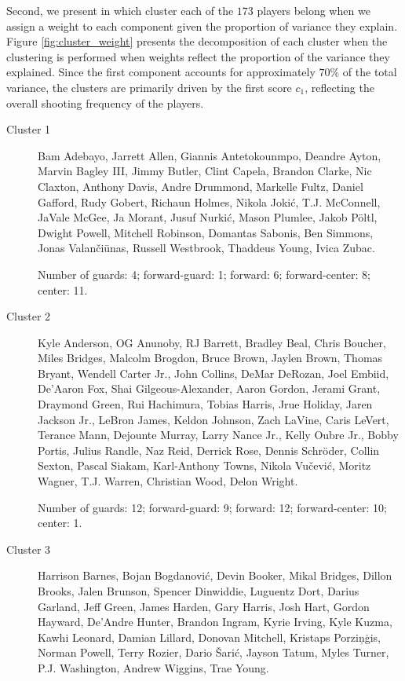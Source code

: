 \documentclass[USenglish]{article}
\theoremstyle{dgthm}
\theoremstyle{dgdef}
\begin{document}
\begin{appendix}
Second, we present in which cluster each of the $173$ players belong when we assign a weight to each component given the proportion of variance they explain. Figure \ref{fig:cluster_weight} presents the decomposition of each cluster when the clustering is performed when weights reflect the proportion of the variance they explained. Since the first component accounts for approximately $70\%$ of the total variance, the clusters are primarily driven by the first score $c_1$, reflecting the overall shooting frequency of the players.


\begin{description}
	\item[Cluster 1] Bam Adebayo, Jarrett Allen, Giannis Antetokounmpo, Deandre Ayton, Marvin Bagley III, Jimmy Butler, Clint Capela, Brandon Clarke, Nic Claxton, Anthony Davis, Andre Drummond, Markelle Fultz, Daniel Gafford, Rudy Gobert, Richaun Holmes, Nikola Jokić, T.J. McConnell, JaVale McGee, Ja Morant, Jusuf Nurkić, Mason Plumlee, Jakob Pöltl, Dwight Powell, Mitchell Robinson, Domantas Sabonis, Ben Simmons, Jonas Valančiūnas, Russell Westbrook, Thaddeus Young, Ivica Zubac.

	      Number of guards: 4; forward-guard: 1; forward: 6; forward-center: 8; center: 11.

	\item[Cluster 2] Kyle Anderson, OG Anunoby, RJ Barrett, Bradley Beal, Chris Boucher, Miles Bridges, Malcolm Brogdon, Bruce Brown, Jaylen Brown, Thomas Bryant, Wendell Carter Jr., John Collins, DeMar DeRozan, Joel Embiid, De'Aaron Fox, Shai Gilgeous-Alexander, Aaron Gordon, Jerami Grant, Draymond Green, Rui Hachimura, Tobias Harris, Jrue Holiday, Jaren Jackson Jr., LeBron James, Keldon Johnson, Zach LaVine, Caris LeVert, Terance Mann, Dejounte Murray, Larry Nance Jr., Kelly Oubre Jr., Bobby Portis, Julius Randle, Naz Reid, Derrick Rose, Dennis Schröder, Collin Sexton, Pascal Siakam, Karl-Anthony Towns, Nikola Vučević, Moritz Wagner, T.J. Warren, Christian Wood, Delon Wright.

	      Number of guards: 12; forward-guard: 9; forward: 12; forward-center: 10; center: 1.

	\item[Cluster 3] Harrison Barnes, Bojan Bogdanović, Devin Booker, Mikal Bridges, Dillon Brooks, Jalen Brunson, Spencer Dinwiddie, Luguentz Dort, Darius Garland, Jeff Green, James Harden, Gary Harris, Josh Hart, Gordon Hayward, De'Andre Hunter, Brandon Ingram, Kyrie Irving, Kyle Kuzma, Kawhi Leonard, Damian Lillard, Donovan Mitchell, Kristaps Porziņģis, Norman Powell, Terry Rozier, Dario Šarić, Jayson Tatum, Myles Turner, P.J. Washington, Andrew Wiggins, Trae Young.


\end{description}
\end{appendix}
\end{document}

